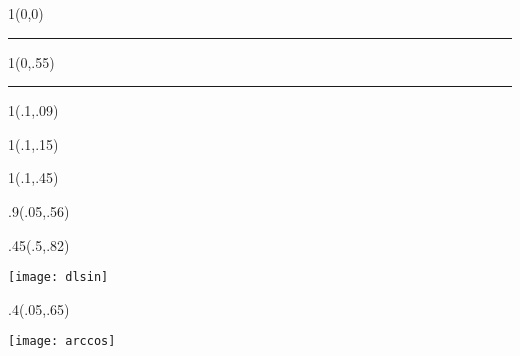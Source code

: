 \pagestyle{empty}

\begin{textblock}{1}(0,0)
    \noindent\textcolor{plop}{\rule{\paperwidth}{.55\paperheight}}
\end{textblock}


\begin{textblock}{1}(0,.55)
    \noindent\textcolor{black}{\rule{\paperwidth}{.45\paperheight}}
\end{textblock}


\begin{textblock}{1}(.1,.09)
    \noindent{\fontsize{24.88}{2}\selectfont
        \bfseries\textcolor{white}{Report for}}
\end{textblock}

\begin{textblock}{1}(.1,.15)
    \noindent {\fontsize{24.88}{2}\selectfont
    \bfseries\textcolor{white}{Digital Image Processing}}
\end{textblock}


\begin{textblock}{1}(.1,.45)
    \noindent {\fontsize{20.74}{2}\selectfont
        \bfseries\textcolor{white}{Fanyong Xue}}
\end{textblock}



\begin{textblock}{.9}(.05,.56)
    \begin{flushright}
        \noindent {\fontsize{20.74}{2}\selectfont
            \bfseries\textcolor{orange}{version 1.1}}
    \end{flushright}
\end{textblock}


\begin{textblock}{.45}(.5,.82)
    \begin{center}
        \texttt{[image: dlsin]}
    \end{center}
\end{textblock}

\begin{textblock}{.4}(.05,.65)
    \begin{center}
        \texttt{[image: arccos]}
    \end{center}
\end{textblock}


